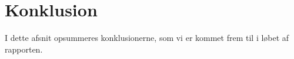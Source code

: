 \section{Konklusion}
I dette afsnit opsummeres konklusionerne, som vi er kommet frem til i løbet af rapporten.